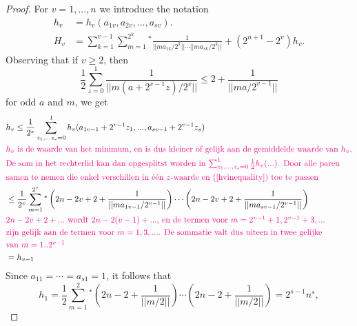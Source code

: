 \documentclass[a4paper, 12pt]{article}
\begin{document}
\begin{proof}
For $v=1,...,n$ we introduce the notation
\begin{align*}
h_v &=h_v(a_{1v},a_{2v},...,a_{sv}). \\
H_v &= \sum_{k=1}^{v-1} \sum_{m=1}^{2^k} {}^*\frac{1}{||ma_{1k}/2^k|| \cdots ||ma_{sk}/2^k||}+(2^{n+1}-2^v)h_v.
\end{align*}
\clearpage
Observing that if $v \ge 2$, then
\begin{equation}
\label{hvinequality}
\frac{1}{2}\sum_{z=0}^{1}\frac{1}{||m(a+2^{v-1}z)/2^v||}\le2+\frac{1}{||ma/2^{v-1}||}
\end{equation}
for odd $a$ and $m$, we get
\begin{equation}
\label{eqn:vlev-1}
\begin{aligned}
&h_v \le \frac{1}{2^s} \sum^1_{z_1,...z_s = 0} h_v(a_{1v-1}+2^{v-1}z_1,...,a_{sv-1}+2^{v-1}z_s) \\
&\mbox{\comm{$h_v$ is de waarde van het minimum, en is dus kleiner of gelijk aan de gemiddelde waarde van $h_v$.}} \\
&\mbox{\comm{De som in het rechterlid kan dan opgesplitst worden in $\sum_{z_1,...,z_s=0}^1\frac{1}{2}h_v(...)$. Door alle paren}} \\ 
&\mbox{\comm{samen te nemen die enkel verschillen in \'e\'en $z$-waarde en (\ref{hvinequality}) toe te passen}}\\
&\le \frac{1}{2^v} \sum_{m=1}^{2^v}{}^*\left(2n-2v+2+\frac{1}{||ma_{1v-1}/2^{v-1}||}\right) \cdots \left(2n-2v+2+\frac{1}{||ma_{sv-1}/2^{v-1}||}\right) \\
&\mbox{\comm{$2n-2v+2+...$ wordt $2n-2(v-1)+...$, en de termen voor $m=2^{v-1}+1,2^{v-1}+3,...$}} \\
&\mbox{\comm{zijn gelijk aan de termen voor $m=1,3,...$. De sommatie valt dus uiteen in twee gelijke}} \\
&\mbox{\comm{van $m=1..2^{v-1}$}} \\
&=h_{v-1}
\end{aligned}
\end{equation}
Since $a_{11} = \cdots = a_{s1} = 1$, it follows that
\begin{equation*}
h_1 = \frac{1}{2}\sum_{m=1}^2{}^*\left(2n-2+\frac{1}{||m/2||}\right) \cdots \left(2n-2+\frac{1}{||m/2||}\right) = 2^{s-1}n^s,

\end{equation*}
\end{proof}
\end{document}
